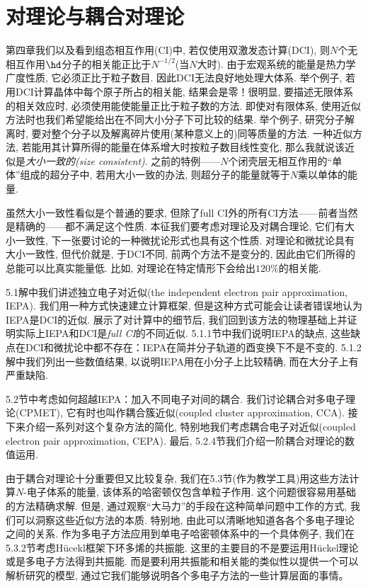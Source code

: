 \chapter{对理论与耦合对理论}
第四章我们以及看到组态相互作用(CI)中, 若仅使用双激发态计算(DCI), 则$N$个无相互作用$\hd$分子的相关能正比于$N^{-1/2}$(当$N$大时). 由于宏观系统的能量是热力学广度性质, 它必须正比于粒子数目. 因此DCI无法良好地处理大体系. 举个例子, 若用DCI计算晶体中每个原子所占的相关能, 结果会是零！很明显, 要描述无限体系的相关效应时, 必须使用能使能量正比于粒子数的方法. 即使对有限体系, 使用近似方法时也我们希望能给出在不同大小分子下可比较的结果. 举个例子, 研究分子解离时, 要对整个分子以及解离碎片使用(某种意义上的)同等质量的方法. 一种近似方法, 若能用其计算所得的能量在体系增大时按粒子数目线性变化, 那么我就说该近似是\emph{大小一致的(size consistent)}. 之前的特例——$N$个闭壳层无相互作用的``单体''组成的超分子中, 若用大小一致的办法, 则超分子的能量就等于$N$乘以单体的能量.

虽然大小一致性看似是个普通的要求, 但除了full CI外的所有CI方法——前者当然是精确的——都不满足这个性质. 本征我们要考虑对理论及对耦合理论, 它们有大小一致性, 下一张要讨论的一种微扰论形式也具有这个性质. 对理论和微扰论具有大小一致性, 但代价就是, 于DCI不同, 前两个方法不是变分的, 因此由它们所得的总能可以比真实能量低. 比如, 对理论在特定情形下会给出$120\%$的相关能.

5.1解中我们讲述独立电子对近似(the independent electron pair approximation, IEPA). 我们用一种方式快速建立计算框架, 但是这种方式可能会让读者错误地认为IEPA是DCI的近似. 展示了对计算中的细节后, 我们回到该方法的物理基础上并证明实际上IEPA和DCI是\emph{full CI}的不同近似. 5.1.1节中我们说明IEPA的缺点, 这些缺点在DCI和微扰论中都不存在：IEPA在简并分子轨道的酉变换下不是不变的. 5.1.2解中我们列出一些数值结果, 以说明IEPA用在小分子上比较精确, 而在大分子上有严重缺陷.

5.2节中考虑如何超越IEPA：加入不同电子对间的耦合. 我们讨论耦合对多电子理论(CPMET), 它有时也叫作耦合簇近似(coupled cluster approximation, CCA). 接下来介绍一系列对这个复杂方法的简化, 特别地我们考虑耦合电子对近似(coupled electron pair approximation, CEPA). 最后, 5.2.4节我们介绍一阶耦合对理论的数值运用.

由于耦合对理论十分重要但又比较复杂, 我们在5.3节(作为教学工具)用这些方法计算$N$-电子体系的能量, 该体系的哈密顿仅包含单粒子作用. 这个问题很容易用基础的方法精确求解. 但是, 通过观察``大马力''的手段在这种简单问题中工作的方式, 我们可以洞察这些近似方法的本质. 特别地, 由此可以清晰地知道各各个多电子理论之间的关系. 作为多电子方法应用到单电子哈密顿体系中的一个具体例子, 我们在5.3.2节考虑H\"ucekl框架下环多烯的共振能. 这里的主要目的不是要运用H\"uckel理论或是多电子方法得到共振能. 而是要利用共振能和相关能的类似性以提供一个可以解析研究的模型, 通过它我们能够说明各个多电子方法的一些计算层面的事情。
